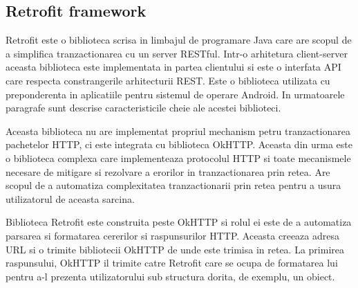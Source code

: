 \subsection{Retrofit framework}\label{sec:retrofit}
Retrofit este o biblioteca scrisa in limbajul de programare Java care are scopul de a simplifica tranzactionarea cu un server RESTful. Intr-o arhitetura 
client-server aceasta biblioteca este implementata in partea clientului si este o interfata API care respecta constrangerile arhitecturii REST. Este o 
biblioteca utilizata cu preponderenta in aplicatiile pentru sistemul de operare Android. In urmatoarele paragrafe sunt descrise caracteristicile cheie 
ale acestei biblioteci.

Aceasta biblioteca nu are implementat propriul mechanism petru tranzactionarea pachetelor HTTP, ci este integrata cu biblioteca OkHTTP. Aceasta din 
urma este o biblioteca complexa care implementeaza protocolul HTTP si toate mecanismele necesare de mitigare si rezolvare a erorilor in tranzactionarea 
prin retea. Are scopul de a automatiza complexitatea tranzactionarii prin retea pentru a usura utilizatorul de aceasta sarcina.
 
Biblioteca Retrofit este construita peste OkHTTP si rolul ei este de a automatiza parsarea si formatarea cererilor si raspunsurilor HTTP. Aceasta creeaza 
adresa URL si o trimite bibliotecii OkHTTP de unde este trimisa in retea. La primirea raspunsului, OkHTTP il trimite catre Retrofit care se ocupa de formatarea 
lui pentru a-l prezenta utilizatorului sub structura dorita, de exemplu, un obiect.

